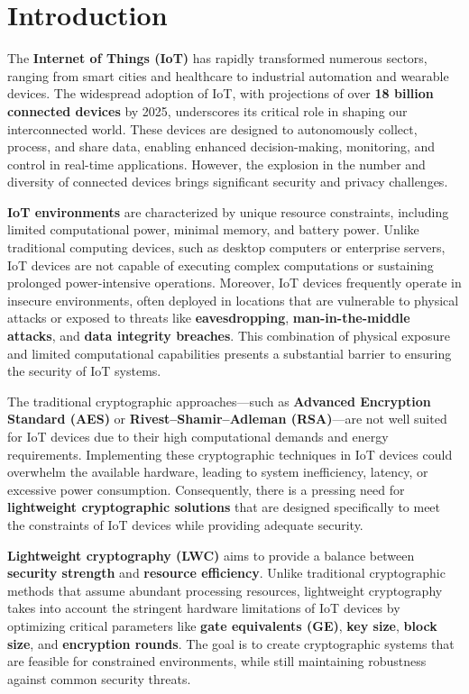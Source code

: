 \documentclass{article}
\begin{document}
\section{Introduction}

The \textbf{Internet of Things (IoT)} has rapidly transformed numerous sectors, ranging from smart cities and healthcare to industrial automation and wearable devices. The widespread adoption of IoT, with projections of over \textbf{18 billion connected devices} by 2025, underscores its critical role in shaping our interconnected world. These devices are designed to autonomously collect, process, and share data, enabling enhanced decision-making, monitoring, and control in real-time applications. However, the explosion in the number and diversity of connected devices brings significant security and privacy challenges.

\textbf{IoT environments} are characterized by unique resource constraints, including limited computational power, minimal memory, and battery power. Unlike traditional computing devices, such as desktop computers or enterprise servers, IoT devices are not capable of executing complex computations or sustaining prolonged power-intensive operations. Moreover, IoT devices frequently operate in insecure environments, often deployed in locations that are vulnerable to physical attacks or exposed to threats like \textbf{eavesdropping}, \textbf{man-in-the-middle attacks}, and \textbf{data integrity breaches}. This combination of physical exposure and limited computational capabilities presents a substantial barrier to ensuring the security of IoT systems.

The traditional cryptographic approaches—such as \textbf{Advanced Encryption Standard (AES)} or \textbf{Rivest–Shamir–Adleman (RSA)}—are not well suited for IoT devices due to their high computational demands and energy requirements. Implementing these cryptographic techniques in IoT devices could overwhelm the available hardware, leading to system inefficiency, latency, or excessive power consumption. Consequently, there is a pressing need for \textbf{lightweight cryptographic solutions} that are designed specifically to meet the constraints of IoT devices while providing adequate security.

\textbf{Lightweight cryptography (LWC)} aims to provide a balance between \textbf{security strength} and \textbf{resource efficiency}. Unlike traditional cryptographic methods that assume abundant processing resources, lightweight cryptography takes into account the stringent hardware limitations of IoT devices by optimizing critical parameters like \textbf{gate equivalents (GE)}, \textbf{key size}, \textbf{block size}, and \textbf{encryption rounds}. The goal is to create cryptographic systems that are feasible for constrained environments, while still maintaining robustness against common security threats.
\end{document}

